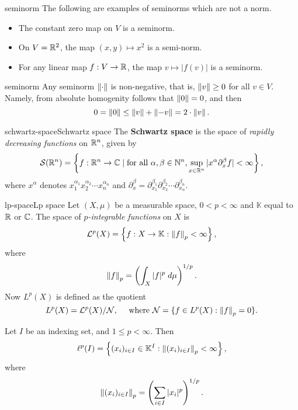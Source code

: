 \begin{example}{seminorm}
    The following are examples of seminorms which are not a norm.
    \begin{itemize}
        \item The constant zero map on $V$ is a seminorm.
        \item On $V = \mathbb{R}^2$, the map $(x, y) \mapsto x^2$ is a semi-norm.
        \item For any linear map $f : V \to \mathbb{R}$, the map $v \mapsto |f(v)|$ is a seminorm.
    \end{itemize}
\end{example}

\begin{example}{seminorm}
    Any seminorm $\left\|\cdot\right\|$ is non-negative, that is, $\left\|v\right\| \ge 0$ for all $v \in V$. Namely, from absolute homogenity follows that $\left\|0\right\| = 0$, and then
    \[ 0 = \left\|0\right\| \le \left\|v\right\| + \left\|-v\right\| = 2 \cdot \left\|v\right\| . \]
\end{example}

\begin{topic}{schwartz-space}{Schwartz space}
    The \textbf{Schwartz space} is the space of \textit{rapidly decreasing functions} on $\mathbb{R}^n$, given by
    \[ \mathcal{S}(\mathbb{R}^n) = \left\{ f : \mathbb{R}^n \to \mathbb{C} \;|\; \textup{for all } \alpha, \beta \in \mathbb{N}^n , \sup_{x \in \mathbb{R}^n} |x^\alpha \partial_x^\beta f| < \infty \right\} , \]
    where $x^\alpha$ denotes $x_1^{\alpha_1} x_2^{\alpha_2} \cdots x_n^{\alpha_n}$ and $\partial_x^\beta = \partial_{x_1}^{\beta_1} \partial_{x_2}^{\beta_2} \cdots \partial_{x_n}^{\beta_n}$.
\end{topic}

\begin{topic}{lp-space}{Lp space}
    Let $(X, \mu)$ be a measurable space, $0 < p < \infty$ and $\mathbb{K}$ equal to $\mathbb{R}$ or $\mathbb{C}$. The space of \textit{$p$-integrable functions} on $X$ is
    \[ \mathcal{L}^p(X) = \left\{ f : X \to \mathbb{K} : \left\|f\right\|_p < \infty \right\} , \]
    where
    \[ \left\|f\right\|_p = \left(\int_X |f|^p \; d\mu \right)^{1/p} . \]
    Now $L^p(X)$ is defined as the quotient
    \[ L^p(X) = \mathcal{L}^p(X) / \mathcal{N} , \quad \text{ where } \mathcal{N} = \{ f \in L^p(X) : \left\|f\right\|_p = 0 \} . \]
    
    Let $I$ be an indexing set, and $1 \le p < \infty$. Then
    \[ \ell^p(I) = \left\{ (x_i)_{i \in I} \in \mathbb{K}^I : \left\|(x_i)_{i \in I}\right\|_p < \infty \right\} , \]
    where
    \[ \left\|(x_i)_{i \in I}\right\|_p = \left(\sum_{i \in I} |x_i|^p \right)^{1/p} . \]
\end{topic}
